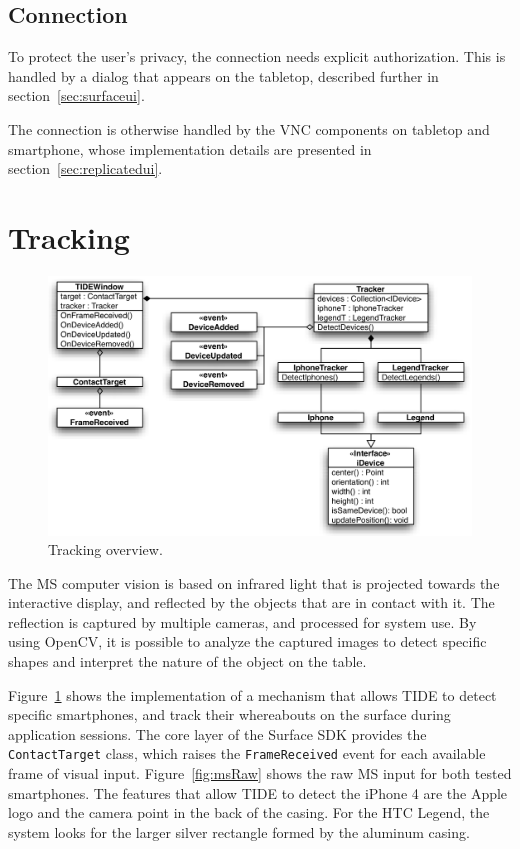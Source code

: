\subsection{Connection}

To protect the user's privacy, the connection needs explicit authorization.
This is handled by a dialog that appears on the tabletop, described further in section~\ref{sec:surfaceui}.

The connection is otherwise handled by the VNC components on tabletop and smartphone, whose implementation details are presented in section~\ref{sec:replicatedui}.

\section{Tracking}
\label{sec:tracking}

\begin{figure}[htbp]
  \centering
    \includegraphics[width=1\textwidth]{images/trackingDiagram}
    \caption{Tracking overview.}
    \label{fig:trackingDiagram}
\end{figure}

The MS computer vision is based on infrared light that is projected towards the interactive display, and reflected by the objects that are in contact with it.
The reflection is captured by multiple cameras, and processed for system use.
By using OpenCV, it is possible to analyze the captured images to detect specific shapes and interpret the nature of the object on the table.

Figure~\ref{fig:trackingDiagram} shows the implementation of a mechanism that allows TIDE to detect specific smartphones, and track their whereabouts on the surface during application sessions.
The core layer of the Surface SDK provides the \texttt{ContactTarget} class, which raises the \texttt{FrameReceived} event for each available frame of visual input.
Figure~\ref{fig:msRaw} shows the raw MS input for both tested smartphones.
The features that allow TIDE to detect the iPhone 4 are the Apple logo and the camera point in the back of the casing.
For the HTC Legend, the system looks for the larger silver rectangle formed by the aluminum casing.

